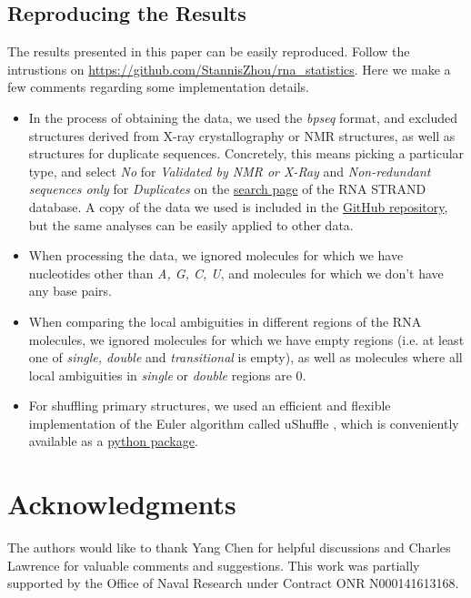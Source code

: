 \documentclass[10pt,letterpaper]{article}
\begin{document}
\subsection*{Reproducing the Results}
The results presented in this paper can be easily reproduced. Follow the intrustions on \url{https://github.com/StannisZhou/rna_statistics}. Here we make a few comments regarding some implementation details.
\begin{itemize}
	\item In the process of obtaining the data, we used the \textit{bpseq} format, and excluded structures derived from X-ray crystallography or NMR structures, as well as structures for duplicate sequences. Concretely, this means picking a particular type, and select \textit{No} for \textit{Validated by NMR or X-Ray} and \textit{Non-redundant sequences only} for \textit{Duplicates} on the \href{http://www.rnasoft.ca/strand/search.php}{search page} of the RNA STRAND database. A copy of the data we used is included in the \href{https://github.com/StannisZhou/rna_statistics/tree/master/data}{GitHub repository}, but the same analyses can be easily  applied to other data.
	\item When processing the data, we ignored molecules for which we have nucleotides other than \textit{A, G, C, U}, and molecules for which we don't have any base pairs.
	\item When comparing the local ambiguities in different regions of the RNA molecules, we ignored molecules for which we have empty regions (i.e. at least one of \textit{single, double} and \textit{transitional} is empty), as well as molecules where all local ambiguities in \textit{single} or \textit{double} regions are 0.
	\item For shuffling primary structures, we used an efficient and flexible implementation of the Euler algorithm\cite{Kandel1996-kz, Fitch1983-ec, Altschul1985-nq} called uShuffle \cite{Jiang2008-yj}, which is conveniently available as a \href{https://github.com/guma44/ushuffle}{python package}.
\end{itemize}

\section*{Acknowledgments}
The authors would like to thank Yang Chen for helpful discussions and Charles Lawrence for valuable comments and suggestions. This work was partially supported by the Office of Naval Research under Contract ONR N000141613168.

\nolinenumbers


\end{document}
